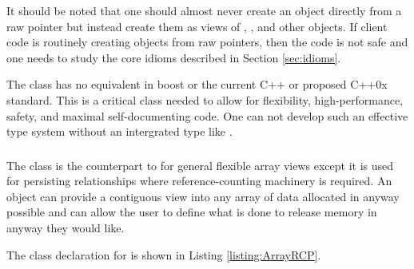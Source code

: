 \documentclass[pdf,ps2pdf,11pt]{SANDreport}
\begin{document}
It should be noted that one should almost never create an {}
object directly from a raw pointer but instead create them as views of
{}, {}, {} and other {}
objects.  If client code is routinely creating {} objects from
raw pointers, then the code is not safe and one needs to study the core idioms
described in Section {}\ref{sec:idioms}.

The class {} has no equivalent in boost or the current C++ or
proposed C++0x standard.  This is a critical class needed to allow for
flexibility, high-performance, safety, and maximal self-documenting code.  One
can not develop such an effective type system without an intergrated type like
{}.


%
{}\subsubsection{}
\label{sec:ArrayRCP}
%

The class {} is the counterpart to {} for general
flexible array views except it is used for persisting relationships where
reference-counting machinery is required.  An {} object can
provide a contiguous view into any array of data allocated in anyway possible
and can allow the user to define what is done to release memory in anyway they
would like.

The class declaration for {} is shown in Listing
{}\ref{listing:ArrayRCP}.
\end{document}
